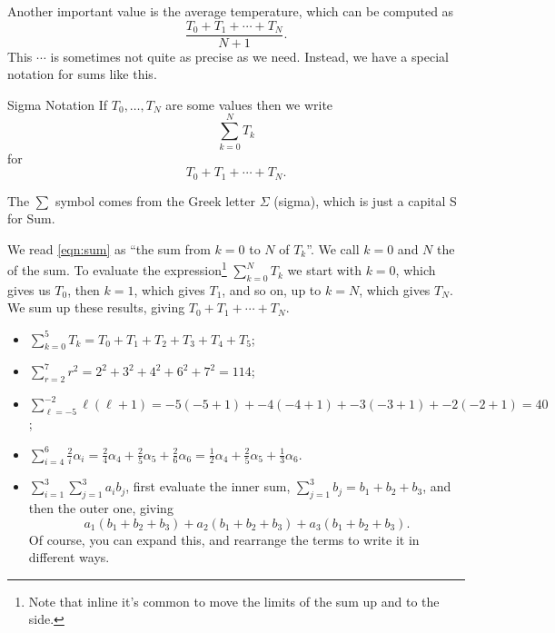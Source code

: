 \documentclass[fleqn]{LectureClass/LectureClass}
\begin{document}
    Another important value is the average temperature, which can be computed as
    \begin{equation}
        \frac{T_0 + T_1 + \dotsb + T_N}{N + 1}.
    \end{equation}
    This \(\dotsb\) is sometimes not quite as precise as we need.
    Instead, we have a special notation for sums like this.
    
    \begin{ntn}{Sigma Notation}{}
        If \(T_0, \dotsc, T_N\) are some values then we write
        \begin{equation}
            \label{eqn:sum}
            \sum_{k=0}^N T_k
        \end{equation}
        for
        \begin{equation}
            T_0 + T_1 + \dotsb + T_N.
        \end{equation}
    \end{ntn}
    
    \begin{remark}{}{}
        The \(\sum\) symbol comes from the Greek letter \(\Sigma\) (sigma), which is just a capital S for Sum.
    \end{remark}
    
    We read \cref{eqn:sum} as \enquote{the sum from \(k = 0\) to \(N\) of \(T_k\)}.
    We call \(k = 0\) and \(N\) the  of the sum.
    To evaluate the expression\footnote{Note that inline it's common to move the limits of the sum up and to the side.} \(\sum_{k=0}^N T_k\) we start with \(k = 0\), which gives us \(T_0\), then \(k = 1\), which gives \(T_1\), and so on, up to \(k = N\), which gives \(T_N\).
    We sum up these results, giving \(T_0 + T_1 + \dotsb + T_N\).
    
    \begin{exm}{}{}
        \begin{itemize}
            \item \(\displaystyle\sum_{k=0}^5 T_k = T_0 + T_1 + T_2 + T_3 + T_4 + T_5\);
            \item \(\displaystyle\sum_{r=2}^7 r^2 = 2^2 + 3^2 + 4^2 + 6^2 + 7^2 = 114\);
            \item \(\displaystyle\sum_{\ell=-5}^{-2} \ell(\ell + 1) = -5(-5 + 1) + -4(-4 + 1) + -3(-3 + 1) + -2(-2 + 1) = 40\);
            \item \(\displaystyle\sum_{i=4}^6 \frac{2}{i}\alpha_i = \frac{2}{4}\alpha_4 + \frac{2}{5} \alpha_5 + \frac{2}{6} \alpha_6 = \frac{1}{2} \alpha_4 + \frac{2}{5}\alpha_5 + \frac{1}{3} \alpha_6\).
            \item \(\displaystyle\sum_{i=1}^3 \sum_{j=1}^3 a_i b_j\), first evaluate the inner sum, \(\sum_{j=1}^3 b_j = b_1 + b_2 + b_3\), and then the outer one, giving
            \begin{equation}
                a_1(b_1 + b_2 + b_3) + a_2(b_1 + b_2 + b_3) + a_3(b_1 + b_2 + b_3).
            \end{equation}
            Of course, you can expand this, and rearrange the terms to write it in different ways.
        \end{itemize}
    \end{exm}
    
\end{document}
